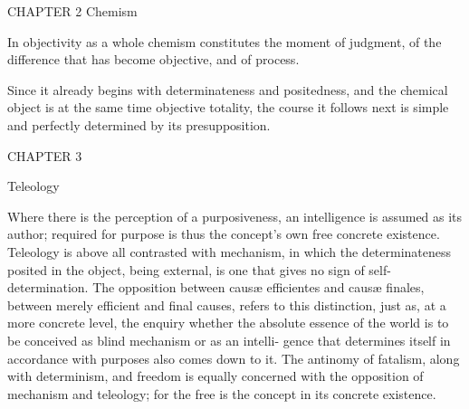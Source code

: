CHAPTER 2 Chemism

In objectivity as a whole
chemism constitutes the moment of judgment,
of the difference that has become objective,
and of process.

Since it already begins with
determinateness and positedness,
and the chemical object is
at the same time objective totality,
the course it follows next is
simple and perfectly determined
by its presupposition.

CHAPTER 3

Teleology

Where there is the perception of a purposiveness,
an intelligence is assumed as its author;
required for purpose is thus the concept's
own free concrete existence.
Teleology is above all contrasted with mechanism,
in which the determinateness posited in the object,
being external, is one that gives no sign of self-determination.
The opposition between causæ efficientes and causæ finales,
between merely efficient and final causes,
refers to this distinction, just as,
 at a more concrete level, the enquiry whether the absolute
essence of the world is to be conceived as blind mechanism or as an intelli-
gence that determines itself in accordance with purposes also comes down
to it.
The antinomy of fatalism, along with determinism,
and freedom is equally concerned with
the opposition of mechanism and teleology;
for the free is the concept in its concrete existence.

